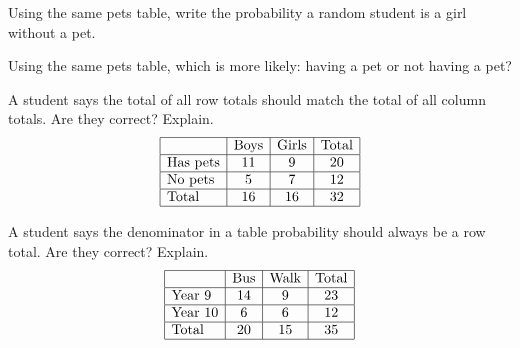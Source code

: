 \documentclass[17pt,a4paper,landscape]{extarticle}
\begin{document}
\begin{tasks}
\task Using the same pets table, write the probability a random student is a girl without a pet.

\task Using the same pets table, which is more likely: having a pet or not having a pet?

\task A student says the total of all row totals should match the total of all column totals. Are they correct? Explain.
\[
\begin{array}{|l|c|c|c|}
\hline
 & \text{Boys} & \text{Girls} & \text{Total} \\\hline
\text{Has pets} & 11 & 9 & 20 \\\hline
\text{No pets} & 5 & 7 & 12 \\\hline
\text{Total} & 16 & 16 & 32 \\\hline
\end{array}
\]

\task A student says the denominator in a table probability should always be a row total. Are they correct? Explain.
\[
\begin{array}{|l|c|c|c|}
\hline
 & \text{Bus} & \text{Walk} & \text{Total} \\\hline
\text{Year 9} & 14 & 9 & 23 \\\hline
\text{Year 10} & 6 & 6 & 12 \\\hline
\text{Total} & 20 & 15 & 35 \\\hline
\end{array}
\]
\end{tasks}
\end{document}

